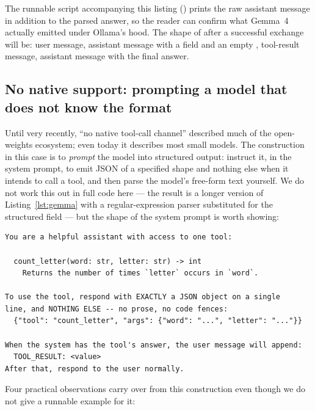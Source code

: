 \noindent
The runnable script accompanying this listing
() prints the
raw assistant message in addition to the parsed answer, so the reader
can confirm what Gemma~4 actually emitted under Ollama's hood. The
shape of  after a successful exchange will be: user
message, assistant message with a  field and an
empty , tool-result message, assistant message with
the final answer.

\subsection{No native support: prompting a model that does not know the format}
\label{sec:impl-fallback}

Until very recently, ``no native tool-call channel'' described much
of the open-weights ecosystem; even today it describes most small
models. The construction in this case is to \emph{prompt} the model
into structured output: instruct it, in the system prompt, to emit
JSON of a specified shape and nothing else when it intends to call a
tool, and then parse the model's free-form text yourself. We do not
work this out in full code here --- the result is a longer version
of Listing~\ref{lst:gemma} with a regular-expression parser
substituted for the structured  field --- but the
shape of the system prompt is worth showing:

\begin{lstlisting}[caption={Fragment of a system prompt that elicits structured tool calls from a model with no native support.},label=lst:fallback-prompt]
You are a helpful assistant with access to one tool:

  count_letter(word: str, letter: str) -> int
    Returns the number of times `letter` occurs in `word`.

To use the tool, respond with EXACTLY a JSON object on a single
line, and NOTHING ELSE -- no prose, no code fences:
  {"tool": "count_letter", "args": {"word": "...", "letter": "..."}}

When the system has the tool's answer, the user message will append:
  TOOL_RESULT: <value>
After that, respond to the user normally.
\end{lstlisting}

\noindent
Four practical observations carry over from this construction even
though we do not give a runnable example for it:

